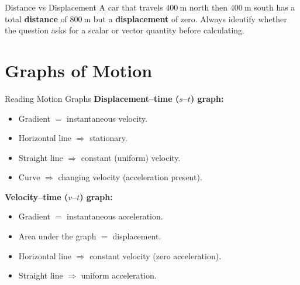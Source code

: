 \begin{warningbox}{Distance vs Displacement}
A car that travels $400\ \text{m}$ north then $400\ \text{m}$ south has a total \textbf{distance} of $800\ \text{m}$ but a \textbf{displacement} of zero. Always identify whether the question asks for a scalar or vector quantity before calculating.
\end{warningbox}

\section{Graphs of Motion}

\begin{keybox}{Reading Motion Graphs}
\textbf{Displacement--time ($s$--$t$) graph:}
\begin{itemize}[itemsep=2pt]
  \item Gradient $=$ instantaneous velocity.
  \item Horizontal line $\Rightarrow$ stationary.
  \item Straight line $\Rightarrow$ constant (uniform) velocity.
  \item Curve $\Rightarrow$ changing velocity (acceleration present).
\end{itemize}
\vspace{0.4em}
\textbf{Velocity--time ($v$--$t$) graph:}
\begin{itemize}[itemsep=2pt]
  \item Gradient $=$ instantaneous acceleration.
  \item Area under the graph $=$ displacement.
  \item Horizontal line $\Rightarrow$ constant velocity (zero acceleration).
  \item Straight line $\Rightarrow$ uniform acceleration.
\end{itemize}
\end{keybox}

